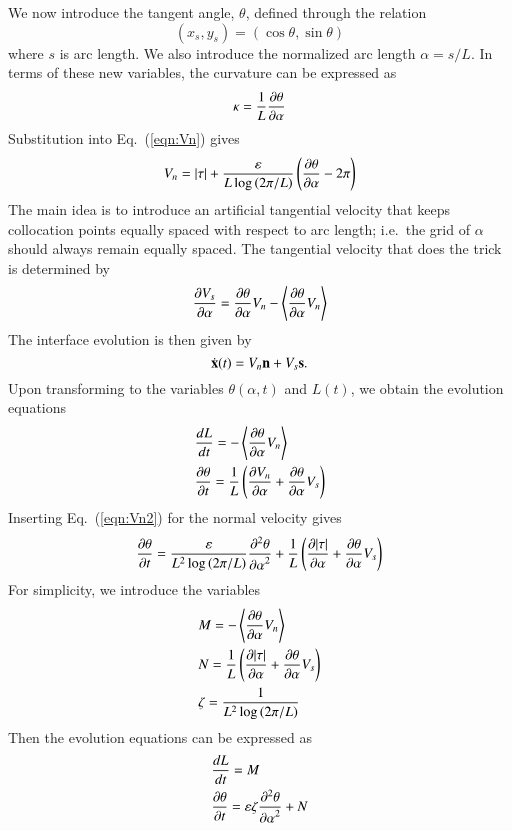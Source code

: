 \documentclass[preprint, 10pt]{elsarticle}
\begin{document}
We now introduce the tangent angle, $\theta$, defined through the relation
\begin{equation}
(x_s, y_s) = (\cos \theta, \sin \theta)
\end{equation}
where $s$ is arc length. We also introduce the normalized arc length $\alpha = s / L$. In terms of these new variables, the curvature can be expressed as
\begin{equation}
\kappa = \frac{1}{L} \frac{\partial \theta}{\partial \alpha}
\end{equation}
Substitution into Eq.~(\ref{eqn:Vn}) gives
\begin{equation}
\label{eqn:Vn2}
V_n = \lvert \tau \rvert + \frac{\varepsilon}{L \log \left(2\pi/L \right)}  \left(\frac{\partial \theta}{\partial \alpha} - 2 \pi \right)
\end{equation}
The main idea is to introduce an artificial tangential velocity that keeps collocation points equally spaced with respect to arc length; i.e.~the grid of $\alpha$ should always remain equally spaced. The tangential velocity that does the trick is determined by \cite{hou-low-she1994}
\begin{equation}
\frac{\partial V_s}{\partial \alpha} = \frac{\partial \theta}{\partial \alpha} V_n - \left< \frac{\partial \theta}{\partial \alpha} V_n \right>
\end{equation}
The interface evolution is then given by
\begin{equation}
\dot{{\mathbf{x}}}(t) = V_n {\mathbf{n}} + V_s {\mathbf{s}}.
\end{equation}
Upon transforming to the variables $\theta(\alpha,t)$ and $L(t)$, we obtain the evolution equations
\begin{align}
& \frac{d L}{d t} = - \left< \frac{\partial \theta}{\partial \alpha} V_n \right> \\
& \frac{\partial \theta}{\partial t} = \frac{1}{L} \left( \frac{\partial V_n}{\partial \alpha} + \frac{\partial \theta}{\partial \alpha} V_s \right)
\end{align}
Inserting Eq.~(\ref{eqn:Vn2}) for the normal velocity gives
\begin{equation}
\frac{\partial \theta}{\partial t} = \frac{\varepsilon}{L^{2} \log \left(2\pi/L \right)} \frac{\partial^2 \theta}{{\partial \alpha}^2} 
+ \frac{1}{L} \left( \frac{\partial \lvert \tau \rvert}{\partial \alpha} + \frac{\partial \theta}{\partial \alpha} V_s \right)
\end{equation}
For simplicity, we introduce the variables
\begin{align}
& M = - \left< \frac{\partial \theta}{\partial \alpha} V_n \right> \\
& N = \frac{1}{L} \left( \frac{\partial \lvert \tau \rvert}{\partial \alpha} + \frac{\partial \theta}{\partial \alpha} V_s \right) \\
& \zeta = \frac{1}{L^{2} \log \left(2\pi/L \right)}
\end{align}
Then the evolution equations can be expressed as
\begin{align}
& \frac{d L}{d t} = M \\
& \frac{\partial \theta}{\partial t} = \varepsilon \zeta \frac{\partial^2 \theta}{{\partial \alpha}^2} + N
\end{align}
\end{document}
